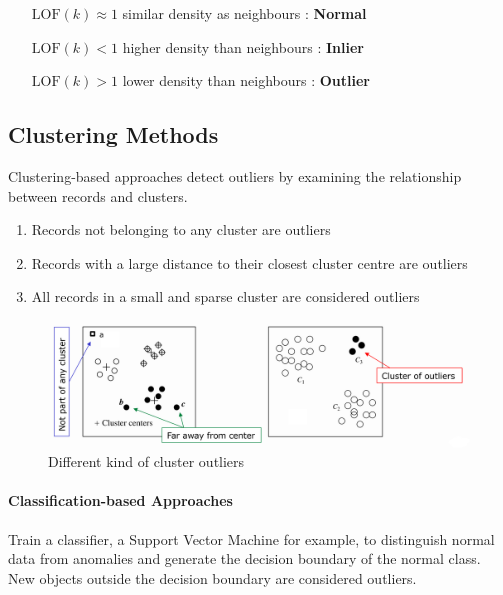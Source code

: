 \documentclass[11pt]{article}
\begin{document}
\begin{itemize}[leftmargin=*, labelindent=2cm, labelsep=1cm]
    \item[$\text{LOF}(k) \approx 1$] similar density as neighbours : \textbf{Normal}
    \item[$\text{LOF}(k) < 1$] higher density than neighbours : \textbf{Inlier}
    \item[$\text{LOF}(k) > 1$]  lower density than neighbours : \textbf{Outlier}
\end{itemize}

\subsection{Clustering Methods}

Clustering-based approaches detect outliers by examining the relationship between records and clusters.

\begin{enumerate}
    \item Records not belonging to any cluster are outliers
    \item Records with a large distance to their closest cluster centre are outliers
    \item All records in a small and sparse cluster are considered outliers
\end{enumerate}

\begin{figure}[tbh!]
    \centering
    \includegraphics[width=0.7\linewidth, keepaspectratio]{Pictures/outlier_clustering_method}
    \caption{Different kind of cluster outliers}
    \label{fig:outlierclusteringmethod}
\end{figure}

\paragraph{Classification-based Approaches}

Train a classifier, a Support Vector Machine for example, to distinguish normal data from anomalies and generate the decision boundary of the normal class. New objects outside the decision boundary are considered outliers.
\end{document}
